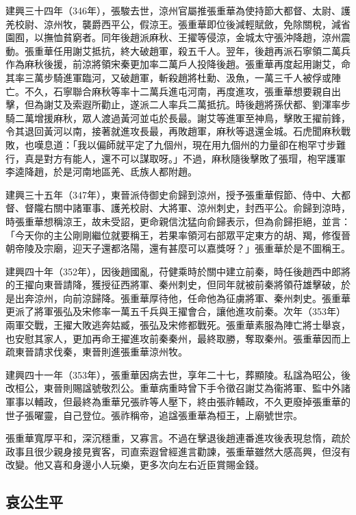 建興三十四年（346年），張駿去世，涼州官屬推張重華為使持節大都督、太尉、護羌校尉、涼州牧，襲爵西平公，假涼王。張重華即位後減輕賦斂，免除關稅，減省園囿，以撫恤貧窮者。同年後趙派麻秋、王擢等侵涼，金城太守張沖降趙，涼州震動。張重華任用謝艾抵抗，終大破趙軍，殺五千人。翌年，後趙再派石寧領二萬兵作為麻秋後援，前涼將領宋秦更加率二萬戶人投降後趙。張重華再度起用謝艾，命其率三萬步騎進軍臨河，又破趙軍，斬殺趙將杜勳、汲魚，一萬三千人被俘或陣亡。不久，石寧聯合麻秋等率十二萬兵進屯河南，再度進攻，張重華想要親自出擊，但為謝艾及索遐所勸止，遂派二人率兵二萬抵抗。時後趙將孫伏都、劉渾率步騎二萬增援麻秋，眾人渡過黃河並屯於長最。謝艾等進軍至神鳥，擊敗王擢前鋒，令其退回黃河以南，接著就進攻長最，再敗趙軍，麻秋等退還金城。石虎聞麻秋戰敗，也嘆息道：「我以偏師就平定了九個州，現在用九個州的力量卻在枹罕寸步難行，真是對方有能人，還不可以謀取呀。」不過，麻秋隨後擊敗了張瑁，枹罕護軍李逵降趙，於是河南地區羌、氐族人都附趙。

建興三十五年（347年），東晉派侍御史俞歸到涼州，授予張重華假節、侍中、大都督、督隴右關中諸軍事、護羌校尉、大將軍、涼州刺史，封西平公。俞歸到涼時，時張重華想稱涼王，故未受詔，更命親信沈猛向俞歸表示，但為俞歸拒絕，並言：「今天你的主公剛剛繼位就要稱王，若果率領河右部眾平定東方的胡、羯，修復晉朝帝陵及宗廟，迎天子還都洛陽，還有甚麼可以嘉獎呀？」張重華於是不圖稱王。

建興四十年（352年），因後趙國亂，苻健乘時於關中建立前秦，時任後趙西中郎將的王擢向東晉請降，獲授征西將軍、秦州刺史，但同年就被前秦將領苻雄擊破，於是出奔涼州，向前涼歸降。張重華厚待他，任命他為征虜將軍、秦州刺史。張重華更派了將軍張弘及宋修率一萬五千兵與王擢會合，讓他進攻前秦。次年（353年）兩軍交戰，王擢大敗逃奔姑臧，張弘及宋修都戰死。張重華素服為陣亡將士舉哀，也安慰其家人，更加再命王擢進攻前秦秦州，最終取勝，奪取秦州。張重華因而上疏東晉請求伐秦，東晉則進張重華涼州牧。

建興四十一年（353年），張重華因病去世，享年二十七，葬顯陵。私諡為昭公，後改桓公，東晉則賜諡號敬烈公。重華病重時曾下手令徵召謝艾為衞將軍、監中外諸軍事以輔政，但最終為重華兄張祚等人壓下，終由張祚輔政，不久更廢掉張重華的世子張曜靈，自己登位。張祚稱帝，追諡張重華為桓王，上廟號世宗。

張重華寬厚平和，深沉穩重，又寡言。不過在擊退後趙連番進攻後表現怠惰，疏於政事且很少親身接見賓客，司直索遐曾經進言勸諫，張重華雖然大感高興，但沒有改變。他又喜和身邊小人玩樂，更多次向左右近臣賞賜金錢。


\subsection{哀公生平}

